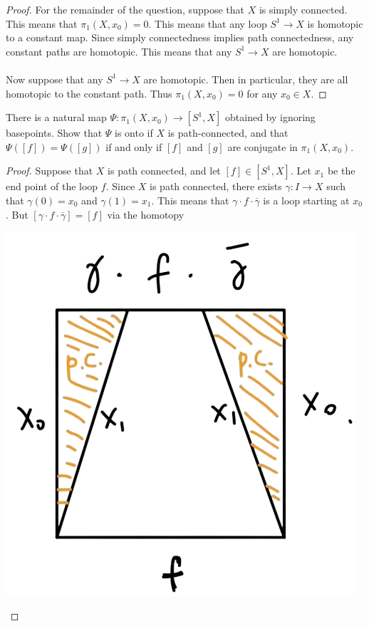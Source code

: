 \documentclass[a4paper]{article}
\begin{document}
\begin{ex}{}{}
\begin{proof}
For the remainder of the question, suppose that $X$ is simply connected. This means that $\pi_1(X,x_0)=0$. This means that any loop $S^1\to X$ is homotopic to a constant map. Since simply connectedness implies path connectedness, any constant paths are homotopic. This means that any $S^1\to X$ are homotopic. \\~\\

Now suppose that any $S^1\to X$ are homotopic. Then in particular, they are all homotopic to the constant path. Thus $\pi_1(X,x_0)=0$ for any $x_0\in X$. 
\end{proof}
\end{ex}

\begin{ex}{}{} There is a natural map $\Psi:\pi_1(X,x_0)\to[S^1,X]$ obtained by ignoring basepoints. Show that $\Psi$ is onto if $X$ is path-connected, and that $\Psi([f])=\Psi([g])$ if and only if $[f]$ and $[g]$ are conjugate in $\pi_1(X,x_0)$. \tcbline
\begin{proof}
Suppose that $X$ is path connected, and let $[f]\in[S^1,X]$. Let $x_1$ be the end point of the loop $f$. Since $X$ is path connected, there exists $\gamma:I\to X$ such that $\gamma(0)=x_0$ and $\gamma(1)=x_1$. This means that $\gamma\cdot f\cdot\overline{\gamma}$ is a loop starting at $x_0$. But $[\gamma\cdot f\cdot\overline{\gamma}]=[f]$ via the homotopy 

\begin{center}
\includegraphics[scale = 0.3]{Image 1}
\end{center}


\end{proof}
\end{ex}
\end{document}
